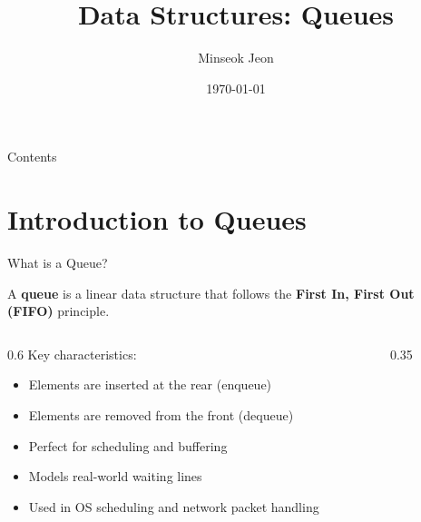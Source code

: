 \documentclass[aspectratio=169,xcolor=dvipsnames]{beamer}
\title[Queues]{Data Structures: Queues}
\author{Minseok Jeon}
\institute{DGIST}
\date{\today}
\begin{document}
\begin{frame}[plain]
  \titlepage
\end{frame}

\begin{frame}[plain]{Contents}
  \tableofcontents
\end{frame}

\section{Introduction to Queues}

\begin{frame}{What is a Queue?}
  \begin{definition}
    A \textbf{queue} is a linear data structure that follows the \textbf{First In, First Out (FIFO)} principle.
  \end{definition}

  \vspace{0.5cm}

  \begin{columns}
    \begin{column}{0.6\textwidth}
      Key characteristics:
      \begin{itemize}
        \item Elements are inserted at the rear (enqueue)
        \item Elements are removed from the front (dequeue)
        \item Perfect for scheduling and buffering
        \item Models real-world waiting lines
        \item Used in OS scheduling and network packet handling
      \end{itemize}
    \end{column}
    \begin{column}{0.35\textwidth}
    \end{column}
  \end{columns}
\end{frame}
\end{document}
